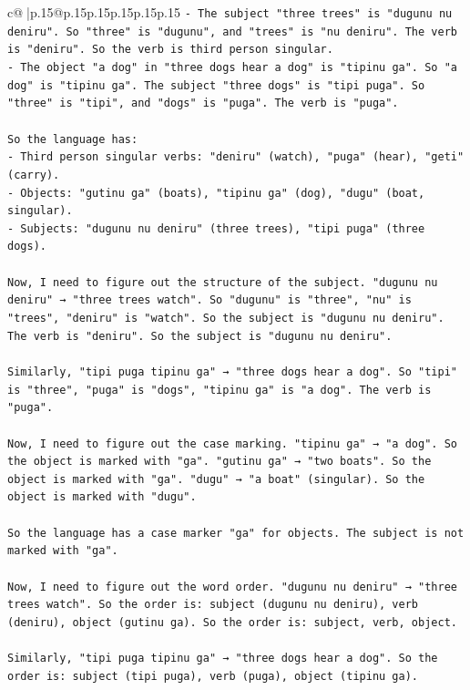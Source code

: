 \documentclass{article}
\begin{document}
{\begin{supertabular}{c@{$\;$}|p{.15\linewidth}@{}p{.15\linewidth}p{.15\linewidth}p{.15\linewidth}p{.15\linewidth}p{.15\linewidth}}
{{{\texttt{{-} The subject "three trees" is "dugunu nu deniru". So "three" is "dugunu", and "trees" is "nu deniru". The verb is "deniru". So the verb is third person singular.} \\
\texttt{{-} The object "a dog" in "three dogs hear a dog" is "tipinu ga". So "a dog" is "tipinu ga". The subject "three dogs" is "tipi puga". So "three" is "tipi", and "dogs" is "puga". The verb is "puga".} \\
\\ 
\texttt{So the language has:} \\
\texttt{{-} Third person singular verbs: "deniru" (watch), "puga" (hear), "geti" (carry).} \\
\texttt{{-} Objects: "gutinu ga" (boats), "tipinu ga" (dog), "dugu" (boat, singular).} \\
\texttt{{-} Subjects: "dugunu nu deniru" (three trees), "tipi puga" (three dogs).} \\
\\ 
\texttt{Now, I need to figure out the structure of the subject. "dugunu nu deniru" → "three trees watch". So "dugunu" is "three", "nu" is "trees", "deniru" is "watch". So the subject is "dugunu nu deniru". The verb is "deniru". So the subject is "dugunu nu deniru".} \\
\\ 
\texttt{Similarly, "tipi puga tipinu ga" → "three dogs hear a dog". So "tipi" is "three", "puga" is "dogs", "tipinu ga" is "a dog". The verb is "puga".} \\
\\ 
\texttt{Now, I need to figure out the case marking. "tipinu ga" → "a dog". So the object is marked with "ga". "gutinu ga" → "two boats". So the object is marked with "ga". "dugu" → "a boat" (singular). So the object is marked with "dugu".} \\
\\ 
\texttt{So the language has a case marker "ga" for objects. The subject is not marked with "ga".} \\
\\ 
\texttt{Now, I need to figure out the word order. "dugunu nu deniru" → "three trees watch". So the order is: subject (dugunu nu deniru), verb (deniru), object (gutinu ga). So the order is: subject, verb, object.} \\
\\ 
\texttt{Similarly, "tipi puga tipinu ga" → "three dogs hear a dog". So the order is: subject (tipi puga), verb (puga), object (tipinu ga).} \\
}}}
\end{supertabular}}
\end{document}
